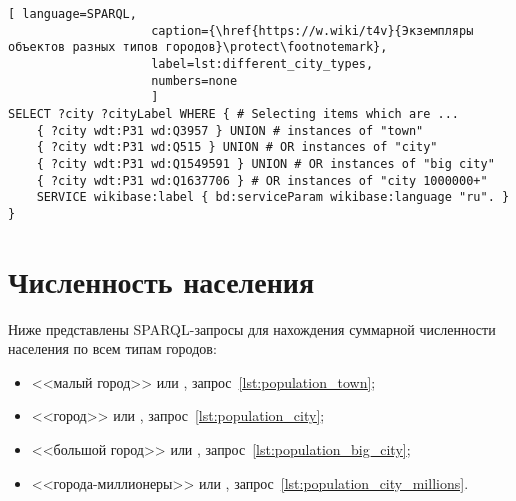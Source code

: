 \begin{lstlisting}[ language=SPARQL, 
                    caption={\href{https://w.wiki/t4v}{Экземпляры объектов разных типов городов}\protect\footnotemark},
                    label=lst:different_city_types,
                    numbers=none
                    ]
SELECT ?city ?cityLabel WHERE { # Selecting items which are ...
	{ ?city wdt:P31 wd:Q3957 } UNION # instances of "town"
	{ ?city wdt:P31 wd:Q515 } UNION # OR instances of "city"
	{ ?city wdt:P31 wd:Q1549591 } UNION # OR instances of "big city"
	{ ?city wdt:P31 wd:Q1637706 } # OR instances of "city 1000000+"                                
	SERVICE wikibase:label { bd:serviceParam wikibase:language "ru". }
}
\end{lstlisting}




\section{Численность населения}

\marginnote{ %
    \MarginQuestion
    Какие из городов названы в честь географических объектов?%
\begin{itemize}
\item \href{https://w.wiki/oL6}{Тольятти}
\item \href{https://w.wiki/oL5}{Тула}
\item \href{https://w.wiki/oL4}{Черняховск}
\item \href{https://w.wiki/oL3}{Курильск}
\item \href{https://w.wiki/oL2}{Вологда}
\item \href{https://w.wiki/oK$}{Обнинск}
\end{itemize}
См. ответ %
на с.~\pageref{answer:cities_geographic_objects}.
}

Ниже представлены SPARQL-запросы для нахождения суммарной численности населения по всем типам городов: 
\begin{itemize}[leftmargin=24pt]
	\item <<малый город>> или , запрос~\ref{lst:population_town};
	\item <<город>> или , запрос~\ref{lst:population_city};
	\item <<большой город>> или , запрос~\ref{lst:population_big_city};
	\item <<города-миллионеры>> или , запрос~\ref{lst:population_city_millions}.
\end{itemize}
%




